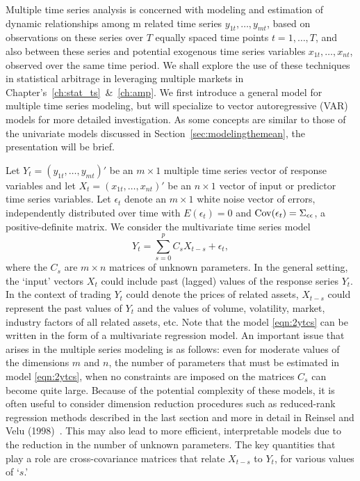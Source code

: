 Multiple time series analysis is concerned with modeling and estimation of dynamic relationships among m related time series $y_{1t}, \ldots, y_{mt}$, based on observations on these series over $T$ equally spaced time points $t= 1, \ldots, T$, and also between these series and potential exogenous time series variables $x_{1t}, \ldots, x_{nt}$, observed over the same time period. We shall explore the use of these techniques in statistical arbitrage in leveraging multiple markets in Chapter's~\ref{ch:stat_ts}~\&~\ref{ch:amp}. We first introduce a general model for multiple time series modeling, but will specialize to vector autoregressive (VAR) models for more detailed investigation. As some concepts are similar to those of the univariate models discussed in Section~\ref{sec:modelingthemean}, the presentation will be brief.


Let $Y_t= (y_{1t}, \ldots, y_{mt})'$ be an $m \times 1$ multiple time series vector of response variables and let $X_t=(x_{1t}, \ldots, x_{nt})'$ be an $n \times 1$ vector of input or predictor time series variables. Let $\epsilon_t$ denote an $m \times 1$ white noise vector of errors, independently distributed over time with $E(\epsilon_t)= 0$ and $\operatorname{Cov}(\epsilon_t)= \Sigma_{\epsilon\epsilon}$, a positive-definite matrix. We consider the multivariate time series model
	\begin{equation} \label{eqn:2ytcs}
	Y_{t} = \sum_{s=0}^{p} C_s X_{t-s} + \epsilon_t,
	\end{equation}
where the $C_s$ are $m \times n$ matrices of unknown parameters. In the general setting, the `input' vectors $X_t$ could include past (lagged) values of the response series $Y_t$. In the context of trading $Y_t$ could denote the prices of related assets, $X_{t-s}$ could represent the past values of $Y_t$ and the values of volume, volatility, market, industry factors of all related assets, etc. Note that the model \eqref{eqn:2ytcs} can be written in the form of a multivariate regression model. An important issue that arises in the multiple series modeling is as follows: even for moderate values of the dimensions $m$ and $n$, the number of parameters that must be estimated in model \eqref{eqn:2ytcs}, when no constraints are imposed on the matrices $C_s$ can become quite large. Because of the potential complexity of these models, it is often useful to consider dimension reduction procedures such as reduced-rank regression methods described in the last section and more in detail in Reinsel and Velu (1998)~\cite{velurein}. This may also lead to more efficient, interpretable models due to the reduction in the number of unknown parameters. The key quantities that play a role are cross-covariance matrices that relate $X_{t-s}$ to $Y_t$, for various values of `$s$.' 


